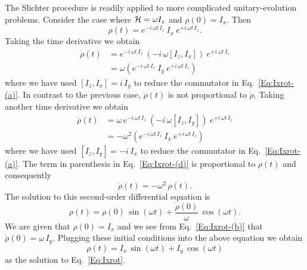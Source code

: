  The Slichter procedure is readily applied to more complicated unitary-evolution problems.  Consider the case where ${\cal H} = \omega I_z$ and $\rho(0) = I_x$.  Then
\begin{equation}
\rho(t) 
	= e^{-i \, \omega t \, I_z} \: I_x \: e^{+i \, \omega t \, I_z}.
	\label{Eq:Ixrot}
\end{equation}
Taking the time derivative we obtain
\begin{subequations}  
\begin{align}
\dot{\rho}(t)
	& = e^{-i \, \omega t \, I_z} \: 
		(-i \, \omega [I_z,I_x] ) 
		\: e^{+i \, \omega t \, I_z} 
		\label{Eq:Ixrot-(a)} \\
	& = \omega \left( 
			e^{-i \, \omega t \, I_z} \: I_y \: e^{+i \, \omega t \, I_z} 
		\right)
		\label{Eq:Ixrot-(b)}
\end{align}
\end{subequations} 
where we have used $[I_z,I_x] = i \, I_y$ to reduce the commutator in Eq.~\ref{Eq:Ixrot-(a)}.  In contrast to the previous case, $\dot{\rho}(t)$ is not proportional to $\dot{\rho}$.  Taking another time derivative we obtain
\begin{subequations}  
\begin{align}
\ddot{\rho}(t)
	& = \omega \, e^{-i \, \omega t \, I_z} \: 
		(-i \, \omega [I_z,I_y] ) 
		\: e^{+i \, \omega t \, I_z} 
		\label{Eq:Ixrot-(c)} \\
	& = - \omega^2 \left( 
			e^{-i \, \omega t \, I_z} \: I_x \: e^{+i \, \omega t \, I_z} 
		\right)
		\label{Eq:Ixrot-(d)}
\end{align}
\end{subequations} 
where we have used $[I_z,I_y] = -i \, I_x$ to reduce the commutator in Eq.~\ref{Eq:Ixrot-(a)}. The term in parenthesis in Eq.~\ref{Eq:Ixrot-(d)} is proportional to $\rho(t)$ and consequently
\begin{equation}
\ddot{\rho}(t) = - \omega^2 \, \rho(t). \label{Eq:Ixrot-ODE}
\end{equation}
The solution to this second-order differential equation is
\begin{equation}
\rho(t) = \rho(0) \, \sin{(\omega t)} + \frac{\dot{\rho}(0)}{\omega} \, \cos{(\omega t)}.
\end{equation}
We are given that $\rho(0) = I_x$ and we see from Eq.~\ref{Eq:Ixrot-(b)} that $\dot{\rho}(0) = \omega \, I_y$.  Plugging these initial conditions into the above equation we obtain
\begin{equation}
\rho(t) 
	= I_x \, \sin{(\omega t)} + I_y \, \cos{(\omega t)}
	\label{Eq:Ixrot-soln}
\end{equation}
as the solution to Eq.~\ref{Eq:Ixrot}.

